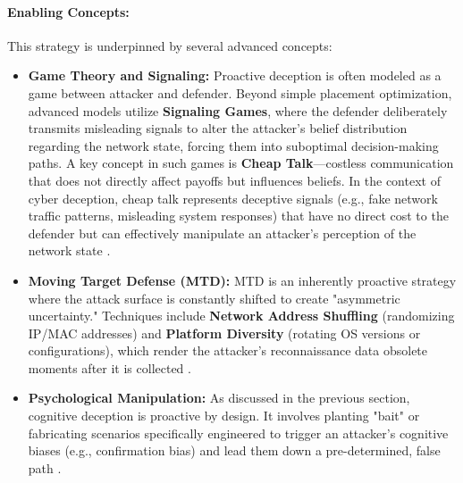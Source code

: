 \paragraph{Enabling Concepts:} This strategy is underpinned by several advanced concepts:
\begin{itemize}
      \item \textbf{Game Theory and Signaling:} Proactive deception is often modeled as a game between attacker
            and defender. Beyond simple placement optimization, advanced models utilize \textbf{Signaling Games}, where
            the defender deliberately transmits misleading signals to alter the attacker's belief distribution regarding
            the network state, forcing them into suboptimal decision-making paths. A key concept in such games
            is \textbf{Cheap Talk}---costless communication that does not directly affect payoffs but influences
            beliefs. In the context of cyber deception, cheap talk represents deceptive signals (e.g., fake
            network traffic patterns, misleading system responses) that have no direct cost to the defender but
            can effectively manipulate an attacker's perception of the network state \cite{pawlick2019game,carroll2011game,zhu2015game}.

      \item \textbf{Moving Target Defense (MTD):} MTD is an inherently proactive strategy where the attack
            surface is constantly shifted to create "asymmetric uncertainty." Techniques include \textbf{Network Address Shuffling}
            (randomizing IP/MAC addresses) and \textbf{Platform Diversity} (rotating OS versions or configurations), which render the
            attacker's reconnaissance data obsolete moments after it is collected \cite{jajodia2011moving}.
      \item \textbf{Psychological Manipulation:} As discussed in the previous section, cognitive deception
            is proactive by design. It involves planting "bait" or fabricating scenarios specifically engineered to trigger an attacker's cognitive
            biases (e.g., confirmation bias) and lead them down a pre-determined, false path \cite{ferguson2021examining}.
\end{itemize}

